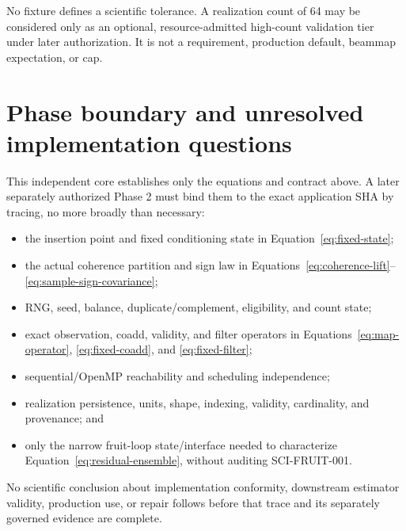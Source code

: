 \documentclass[11pt]{article}
\begin{document}
No fixture defines a scientific tolerance.  A realization count of 64 may be
considered only as an optional, resource-admitted high-count validation tier
under later authorization.  It is not a requirement, production default,
beammap expectation, or cap.

\section{Phase boundary and unresolved implementation questions}

This independent core establishes only the equations and contract above.  A
later separately authorized Phase 2 must bind them to the exact application
SHA by tracing, no more broadly than necessary:
\begin{itemize}
\item the insertion point and fixed conditioning state in
Equation~\eqref{eq:fixed-state};
\item the actual coherence partition and sign law in
Equations~\eqref{eq:coherence-lift}--\eqref{eq:sample-sign-covariance};
\item RNG, seed, balance, duplicate/complement, eligibility, and count state;
\item exact observation, coadd, validity, and filter operators in
Equations~\eqref{eq:map-operator}, \eqref{eq:fixed-coadd}, and
\eqref{eq:fixed-filter};
\item sequential/OpenMP reachability and scheduling independence;
\item realization persistence, units, shape, indexing, validity,
cardinality, and provenance; and
\item only the narrow fruit-loop state/interface needed to characterize
Equation~\eqref{eq:residual-ensemble}, without auditing SCI-FRUIT-001.
\end{itemize}
No scientific conclusion about implementation conformity, downstream
estimator validity, production use, or repair follows before that trace and
its separately governed evidence are complete.
\end{document}
